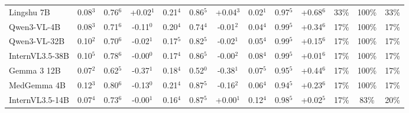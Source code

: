 \documentclass{article}
\begin{document}
\begin{table}[t]
{\begin{tabular}{l@{\hspace{3pt}}ccc@{\hspace{4pt}}ccc@{\hspace{4pt}}ccc@{\hspace{4pt}}ccc}
Lingshu 7B & \cellcolor{cfSage2}0.08$^{3}$ & \cellcolor{cfSage3}0.76$^{6}$ & \cellcolor{cfTerra2}+0.02$^{1}$ & \cellcolor{cfSage4}0.21$^{4}$ & \cellcolor{cfSage3}0.86$^{5}$ & \cellcolor{cfTerra2}+0.04$^{3}$ & \cellcolor{cfSage1}0.02$^{1}$ & \cellcolor{cfSage4}0.97$^{5}$ & \cellcolor{cfTerra4}+0.68$^{6}$ & \cellcolor{cfTerra3}33\% & \cellcolor{cfTerra4}100\% & 33\% \\
Qwen3-VL-4B & \cellcolor{cfSage2}0.08$^{3}$ & \cellcolor{cfSage2}0.71$^{6}$ & \cellcolor{cfSlate3}-0.11$^{0}$ & \cellcolor{cfSage4}0.20$^{4}$ & \cellcolor{cfSage2}0.74$^{4}$ & \cellcolor{cfSlate1}-0.01$^{2}$ & \cellcolor{cfSage1}0.04$^{4}$ & \cellcolor{cfSage4}0.99$^{5}$ & \cellcolor{cfTerra4}+0.34$^{6}$ & \cellcolor{cfTerra3}17\% & \cellcolor{cfTerra4}100\% & 17\% \\
Qwen3-VL-32B & \cellcolor{cfSage2}0.10$^{2}$ & \cellcolor{cfSage2}0.70$^{6}$ & \cellcolor{cfSlate2}-0.02$^{1}$ & \cellcolor{cfSage3}0.17$^{5}$ & \cellcolor{cfSage3}0.82$^{5}$ & \cellcolor{cfSlate2}-0.02$^{1}$ & \cellcolor{cfSage2}0.05$^{4}$ & \cellcolor{cfSage4}0.99$^{5}$ & \cellcolor{cfTerra3}+0.15$^{6}$ & \cellcolor{cfTerra3}17\% & \cellcolor{cfTerra4}100\% & 17\% \\
InternVL3.5-38B & \cellcolor{cfSage2}0.10$^{5}$ & \cellcolor{cfSage3}0.78$^{6}$ & \cellcolor{cfSlate1}-0.00$^{0}$ & \cellcolor{cfSage3}0.17$^{4}$ & \cellcolor{cfSage3}0.86$^{5}$ & \cellcolor{cfSlate1}-0.00$^{2}$ & \cellcolor{cfSage2}0.08$^{4}$ & \cellcolor{cfSage4}0.99$^{5}$ & \cellcolor{cfTerra1}+0.01$^{6}$ & \cellcolor{cfTerra3}17\% & \cellcolor{cfTerra4}100\% & 17\% \\
Gemma 3 12B & \cellcolor{cfSage2}0.07$^{2}$ & \cellcolor{cfSage2}0.62$^{5}$ & \cellcolor{cfSlate4}-0.37$^{1}$ & \cellcolor{cfSage3}0.18$^{4}$ & \cellcolor{cfSage1}0.52$^{0}$ & \cellcolor{cfSlate4}-0.38$^{1}$ & \cellcolor{cfSage2}0.07$^{5}$ & \cellcolor{cfSage4}0.95$^{5}$ & \cellcolor{cfTerra4}+0.44$^{6}$ & \cellcolor{cfTerra3}17\% & \cellcolor{cfTerra4}100\% & 17\% \\
MedGemma 4B & \cellcolor{cfSage3}0.12$^{3}$ & \cellcolor{cfSage3}0.80$^{6}$ & \cellcolor{cfSlate3}-0.13$^{0}$ & \cellcolor{cfSage4}0.21$^{4}$ & \cellcolor{cfSage3}0.87$^{5}$ & \cellcolor{cfSlate3}-0.16$^{2}$ & \cellcolor{cfSage2}0.06$^{4}$ & \cellcolor{cfSage4}0.94$^{5}$ & \cellcolor{cfTerra3}+0.23$^{6}$ & \cellcolor{cfTerra3}17\% & \cellcolor{cfTerra4}100\% & 17\% \\
InternVL3.5-14B & \cellcolor{cfSage2}0.07$^{4}$ & \cellcolor{cfSage2}0.73$^{6}$ & \cellcolor{cfSlate1}-0.00$^{1}$ & \cellcolor{cfSage3}0.16$^{4}$ & \cellcolor{cfSage3}0.87$^{5}$ & \cellcolor{cfTerra1}+0.00$^{1}$ & \cellcolor{cfSage3}0.12$^{4}$ & \cellcolor{cfSage4}0.98$^{5}$ & \cellcolor{cfTerra1}+0.02$^{5}$ & \cellcolor{cfTerra3}17\% & \cellcolor{cfTerra3}83\% & 20\% \\

\end{tabular}}
\end{table}
\end{document}

